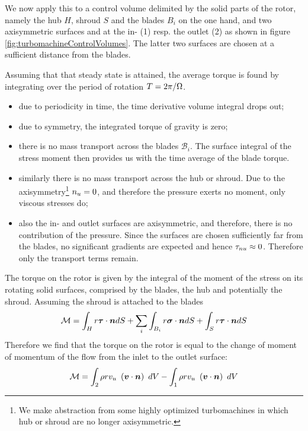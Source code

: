 We now apply this to a control volume delimited by the solid parts of
the rotor, namely the hub $H$, shroud $S$ and the blades $B_i$ on the
one hand, and two axisymmetric surfaces and at the in- (1) resp. the
outlet (2) as shown in figure
\ref{fig:turbomachineControlVolumes}. The latter two surfaces are
chosen at a sufficient distance from the blades. 

Assuming that that steady state is attained, the average torque is
found by integrating over the period of rotation $T = 2 \pi / \Omega$.
\begin{itemize}
\item due to periodicity in time, the time derivative volume integral
  drops out;
\item due to symmetry, the integrated torque of gravity is zero;
\item there is no mass transport across the blades $\mathcal B_i$. The
  surface integral of the stress moment then provides us with the time
  average of the blade torque.
\item similarly there is no mass transport across the hub or
  shroud. Due to the axisymmetry\footnote{We make abstraction from
    some highly optimized turbomachines in which hub or shroud are no
    longer axisymmetric.} $n_u=0$, and therefore the pressure
  exerts no moment, only viscous stresses do;
\item also the in- and outlet surfaces are axisymmetric, and
  therefore, there is no contribution of the pressure. Since the
  surfaces are chosen sufficiently far from the blades, no significant
  gradients are expected and hence $\tau_{nu} \approx
  0$. Therefore only the transport terms remain.
\end{itemize}
The torque on the rotor is given by the integral of the moment of the
stress on its rotating solid surfaces, comprised by the blades, the
hub and potentially the shroud. Assuming the shroud is attached to the
blades
\begin{align*}
  \mathcal M = 
  \int_{H} r \boldsymbol {\tau} \cdot \boldsymbol {n} dS + 
  \sum_i \int_{B_i} r \boldsymbol {\sigma} \cdot \boldsymbol {n} dS + 
  \int_{S} r \boldsymbol {\tau} \cdot \boldsymbol {n} dS
\end{align*}
Therefore we find that the torque on the rotor is equal to the change
of moment of momentum of the flow from the inlet to the outlet
surface:
\begin{equation}
  \mathcal M =
  \int_{2} \rho r v_u ~ \left(\boldsymbol {v} \cdot \boldsymbol {n}\right)~dV  - 
  \int_{1} \rho r v_u ~ \left(\boldsymbol {v} \cdot \boldsymbol {n}\right)~dV
  \label{eq:eulerMoment}
\end{equation}
